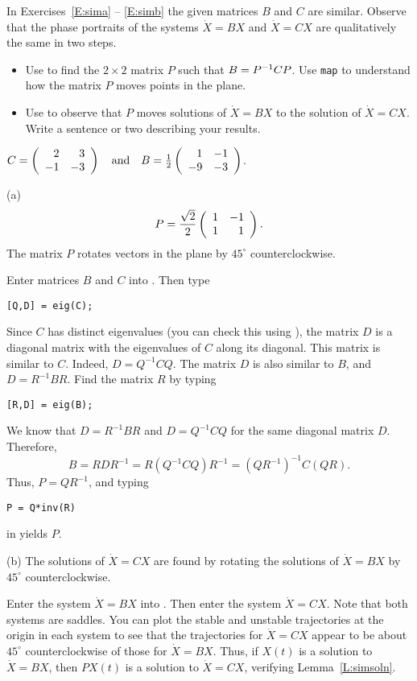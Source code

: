 \documentclass{ximera}
\begin{document}
\noindent In Exercises~\ref{E:sima} -- \ref{E:simb} the given matrices $B$
and $C$ are similar.  Observe that the phase portraits of the systems
$\dot{X}=BX$ and $\dot{X}=CX$ are qualitatively the same in two steps.
\begin{itemize}
\item[(a)]  Use \Matlab to find the $2\times 2$ matrix $P$ such that
$B=P^{-1} CP$.  Use {\tt map} to understand how the matrix $P$ moves points 
in the plane.
\item[(b)]  Use {\pplane} to observe that $P$ moves solutions of
$\dot{X}=BX$ to the solution of $\dot{X}=CX$.  Write a sentence or two describing your results.
\end{itemize}
\begin{computerExercise} \label{E:sima}
$C = \left(\begin{array}{rr} 2 & 3\\ -1 &-3\end{array}\right) \quad\mbox{and}\quad B = \frac{1}{2}\left(\begin{array}{rr} 1 & -1\\ -9 &-3\end{array}\right)$.

\begin{solution}

(a) \ans
\[
P = \frac{\sqrt{2}}{2}\left(\begin{array}{rr} 1 & -1\\ 1 &1\end{array}\right).
\]
The matrix $P$ rotates vectors in the plane by $45^\circ$ counterclockwise.

\soln Enter matrices $B$ and $C$ into \Matlabp.  Then type
\begin{verbatim}
[Q,D] = eig(C);
\end{verbatim}
Since $C$ has distinct eigenvalues (you can check this using
\Matlabp), the matrix $D$ is a diagonal matrix with the eigenvalues of
$C$ along its diagonal.  This matrix is similar to $C$.  Indeed, $D =
Q^{-1}CQ$.  The matrix $D$ is also similar to $B$, and $D= R^{-1}BR$.
Find the matrix $R$ by typing
\begin{verbatim}
[R,D] = eig(B);
\end{verbatim}
We know that $D = R^{-1}BR$ and $D = Q^{-1}CQ$ for the same diagonal
matrix $D$.  Therefore,
\[
B = RDR^{-1} = R(Q^{-1}CQ)R^{-1} = (QR^{-1})^{-1}C(QR).
\]
Thus, $P = QR^{-1}$, and typing
\begin{verbatim}
P = Q*inv(R)
\end{verbatim}
in \Matlab yields $P$.

(b) \ans The solutions of $\dot{X} = CX$ are found by rotating the
solutions of $\dot{X} = BX$ by $45^\circ$ counterclockwise.

\soln Enter the system $\dot{X} = BX$ into {\pplane}.  Then enter the
system $\dot{X} = CX$.  Note that both systems are saddles.  You can
plot the stable and unstable trajectories at the origin in each system
to see that the trajectories for $\dot{X} = CX$ appear to be about
$45^\circ$ counterclockwise of those for $\dot{X} = BX$.  Thus, if
$X(t)$ is a solution to $\dot{X} = BX$, then $PX(t)$ is a solution to
$\dot{X} = CX$, verifying Lemma~\ref{L:simsoln}.

\end{solution}

\end{computerExercise}
\end{document}
